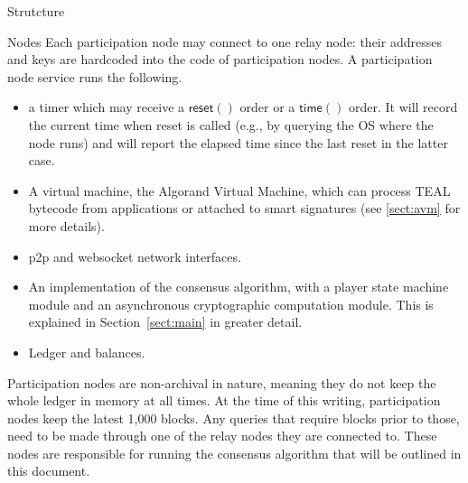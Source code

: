 \documentclass[10pt,a4paper]{article}
\begin{document}
\begin{section}{Strutcture}
\begin{subsection}{Nodes}
Each participation node may connect to one relay node: their addresses and keys
are hardcoded into the code of participation nodes.
A participation node service runs the following.
\begin{itemize}
    \item a timer which may receive a $\mathsf{reset()}$ order or a $\mathsf{time()}$
order. It will record the current time when reset is called (e.g., by querying
the OS where the node runs) and will report the elapsed time since the last reset
in the latter case.
    \item A virtual machine, the Algorand Virtual Machine, which can process TEAL bytecode
from applications or attached to smart signatures (see \ref{sect:avm} for more details). 
    \item p2p and websocket network interfaces.
    \item An implementation of the consensus algorithm, with a player state machine module and
    an asynchronous cryptographic computation module. This is explained in Section~\ref{sect:main}
    in greater detail.
    \item Ledger and balances.
\end{itemize}

Participation nodes are non-archival in nature, meaning they do not keep
the whole ledger in memory at all times. At the time of this writing,
participation nodes keep the latest 1,000 blocks.
Any queries that require blocks prior to those, need to be made
through one of the relay nodes they are connected to.
These nodes are responsible for running the consensus algorithm that
will be outlined in this document.


\end{subsection}
\end{section}
\end{document}
